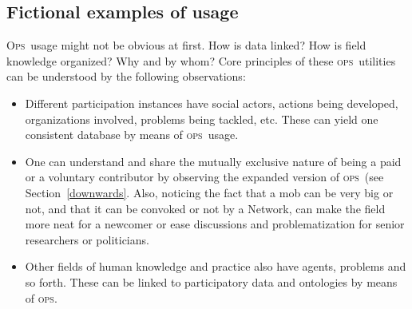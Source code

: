 \documentclass[10pt,letterpaper]{article}
\newcommand{\ops}{\textsc{ops}}
\newcommand{\opsi}{O\textsc{ps}}
\begin{document}
\subsection{Fictional examples of usage}\label{examplesUsage}

\opsi\ usage might not be obvious at first. How is data linked? How is field knowledge organized? Why and by whom? Core principles of these \ops\ utilities can be understood by the following observations:
\begin{itemize}
    \item Different participation instances have social actors, actions being developed, organizations involved, problems being tackled, etc. These can yield one consistent database by means of \ops\ usage.
    \item One can understand and share the mutually exclusive nature of being a paid or a voluntary contributor by observing the expanded version of \ops\ (see Section~\ref{downwards}. Also, noticing the fact that a mob can be very big or not, and that it can be convoked or not by a Network, can make the field more neat for a newcomer or ease discussions and problematization for senior researchers or politicians.
    \item Other fields of human knowledge and practice also have agents, problems and so forth. These can be linked to participatory data and ontologies by means of \ops.
\end{itemize}
\end{document}
